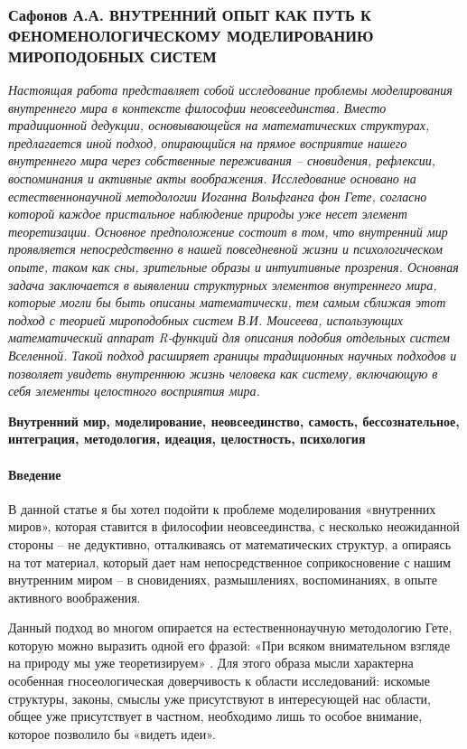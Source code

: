\subsubsection{Сафонов А.А. ВНУТРЕННИЙ ОПЫТ КАК ПУТЬ К ФЕНОМЕНОЛОГИЧЕСКОМУ МОДЕЛИРОВАНИЮ МИРОПОДОБНЫХ СИСТЕМ}
\label{subsubsec:safonov-title-ru}

\textit{Настоящая работа представляет собой исследование проблемы моделирования внутреннего мира в контексте философии неовсеединства. Вместо традиционной дедукции, основывающейся на математических структурах, предлагается иной подход, опирающийся на прямое восприятие нашего внутреннего мира через собственные переживания – сновидения, рефлексии, воспоминания и активные акты воображения. Исследование основано на естественнонаучной методологии Иоганна Вольфганга фон Гете, согласно которой каждое пристальное наблюдение природы уже несет элемент теоретизации. Основное предположение состоит в том, что внутренний мир проявляется непосредственно в нашей повседневной жизни и психологическом опыте, таком как сны, зрительные образы и интуитивные прозрения. Основная задача заключается в выявлении структурных элементов внутреннего мира, которые могли бы быть описаны математически, тем самым сближая этот подход с теорией мироподобных систем В.И. Моисеева, использующих математический аппарат R-функций для описания подобия отдельных систем Вселенной. Такой подход расширяет границы традиционных научных подходов и позволяет увидеть внутреннюю жизнь человека как систему, включающую в себя элементы целостного восприятия мира.}

\textbf{Внутренний мир, моделирование, неовсеединство, самость, бессознательное, интеграция, методология, идеация, целостность, психология}

\paragraph*{Введение}
В данной статье я бы хотел подойти к проблеме моделирования «внутренних миров», которая ставится в философии неовсеединства, с несколько неожиданной стороны – не дедуктивно, отталкиваясь от математических структур, а опираясь на тот материал, который дает нам непосредственное соприкосновение с нашим внутренним миром – в сновидениях, размышлениях, воспоминаниях, в опыте активного воображения.

Данный подход во многом опирается на естественнонаучную методологию Гете, которую можно выразить одной его фразой: «При всяком внимательном взгляде на природу мы уже теоретизируем» \cite{goethe1957}. Для этого образа мысли характерна особенная гносеологическая доверчивость к области исследований: искомые структуры, законы, смыслы уже присутствуют в интересующей нас области, общее уже присутствует в частном, необходимо лишь то особое внимание, которое позволило бы «видеть идеи».

